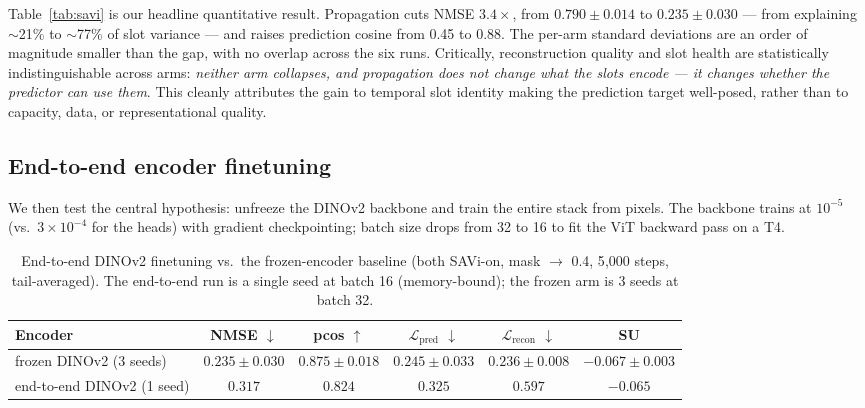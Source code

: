 \documentclass[12pt]{article}
\begin{document}
Table~\ref{tab:savi} is our headline quantitative result. Propagation cuts NMSE $3.4\times$, from $0.790 \pm 0.014$ to $0.235 \pm 0.030$ --- from explaining $\sim$21\% to $\sim$77\% of slot variance --- and raises prediction cosine from 0.45 to 0.88. The per-arm standard deviations are an order of magnitude smaller than the gap, with no overlap across the six runs. Critically, reconstruction quality and slot health are statistically indistinguishable across arms: \emph{neither arm collapses, and propagation does not change what the slots encode --- it changes whether the predictor can use them}. This cleanly attributes the gain to temporal slot identity making the prediction target well-posed, rather than to capacity, data, or representational quality.

\subsection{End-to-end encoder finetuning}
\label{sec:e2e}

We then test the central hypothesis: unfreeze the DINOv2 backbone and train the entire stack from pixels. The backbone trains at $10^{-5}$ (vs.\ $3 \times 10^{-4}$ for the heads) with gradient checkpointing; batch size drops from 32 to 16 to fit the ViT backward pass on a T4.

\begin{table}[t]
\centering
\caption{End-to-end DINOv2 finetuning vs.\ the frozen-encoder baseline (both SAVi-on, mask $\rightarrow$ 0.4, 5{,}000 steps, tail-averaged). The end-to-end run is a single seed at batch 16 (memory-bound); the frozen arm is 3 seeds at batch 32.}
\small
\begin{tabular}{@{}lccccc@{}}
\toprule
\textbf{Encoder} & \textbf{NMSE} $\downarrow$ & \textbf{pcos} $\uparrow$ & $\mathcal{L}_{\text{pred}}$ $\downarrow$ & $\mathcal{L}_{\text{recon}}$ $\downarrow$ & \textbf{SU} \\
\midrule
frozen DINOv2 (3 seeds) & $0.235 \pm 0.030$ & $0.875 \pm 0.018$ & $0.245 \pm 0.033$ & $0.236 \pm 0.008$ & $-0.067 \pm 0.003$ \\
end-to-end DINOv2 (1 seed) & $0.317$ & $0.824$ & $0.325$ & $0.597$ & $-0.065$ \\
\bottomrule
\end{tabular}
\label{tab:e2e}
\end{table}
\end{document}
